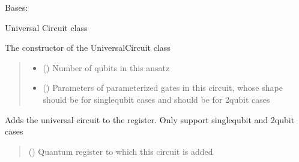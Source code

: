 \documentclass[letterpaper,10pt,english]{sphinxmanual}
\begin{document}
\begin{fulllineitems}
\label{\detokenize{qcompute_qapp.circuit:qcompute_qapp.circuit.UniversalCircuit}}
\pysigstartsignatures
{}
\pysigstopsignatures
\sphinxAtStartPar
Bases: {\hyperref[\detokenize{qcompute_qapp.circuit:qcompute_qapp.circuit.ParameterizedCircuit}]{}}

\sphinxAtStartPar
Universal Circuit class

\sphinxAtStartPar
The constructor of the UniversalCircuit class
\begin{quote}\begin{description}
\begin{itemize}
\item {} 
\sphinxAtStartPar
{} () \textendash{} Number of qubits in this ansatz

\item {} 
\sphinxAtStartPar
{} () \textendash{} Parameters of parameterized gates in this circuit, whose shape should be 
for single\sphinxhyphen{}qubit cases and should be  for 2\sphinxhyphen{}qubit cases

\end{itemize}

\end{description}\end{quote}

\begin{fulllineitems}
\label{\detokenize{qcompute_qapp.circuit:qcompute_qapp.circuit.UniversalCircuit.add_circuit}}
\pysigstartsignatures
{}
\pysigstopsignatures
\sphinxAtStartPar
Adds the universal circuit to the register. Only support single\sphinxhyphen{}qubit and 2\sphinxhyphen{}qubit cases
\begin{quote}\begin{description}
\sphinxAtStartPar
{} () \textendash{} Quantum register to which this circuit is added


\end{description}
\end{quote}
\end{fulllineitems}
\end{fulllineitems}
\end{document}
